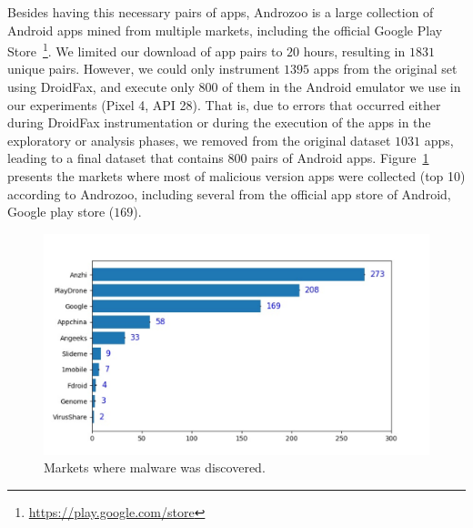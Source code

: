 Besides having this necessary pairs of apps, Androzoo is a large collection of Android apps mined from multiple markets, including the official Google Play Store~\footnote{\url{https://play.google.com/store}}. We limited our download of app pairs to $20$ hours, resulting in $1831$ unique pairs. However, we could only instrument $1395$ apps from the original set using DroidFax, and execute only $800$ of them in the Android emulator we use in our experiments (Pixel 4, API 28). That is, due to errors that occurred either during DroidFax instrumentation or during the execution of the apps in the exploratory or analysis phases, we removed from the original dataset $1031$ apps, leading to a final dataset that contains $800$ pairs of Android apps. Figure~\ref{fig:stores} presents the markets where most of malicious version apps were collected (top 10) according to Androzoo, including several from the official app store of Android, Google play store ($169$).


\begin{figure}[ht]
\centering
\includegraphics[scale=0.4]{images/stores.pdf}
\caption{Markets where malware was discovered.}
 \label{fig:stores}
\end{figure}



